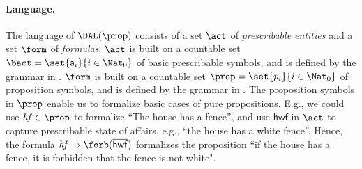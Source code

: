 
\paragraph{Language.}
	The language of $\DAL(\prop)$ consists of a set $\act$ of \emph{prescribable  entities} and a set $\form$ of \emph{formulas}.
	$\act$ is built on a countable set $\bact = \set{\mathsf{a}_i}{i\in \Nat_0}$ of basic prescribable symbols, and is defined by the grammar in .
	$\form$ is built on a countable set $\prop = \set{p_i}{i \in \Nat_0}$ of proposition symbols, and is defined by the grammar in .
The proposition symbols in $\prop$ enable us to formalize basic cases of pure propositions. E.g., we could use $\mathit{hf} \in \prop$ to formalize ``The house has a  fence'',  and
use $\mathsf{hwf}$ in $\act$ to capture prescribable state of affairs,  e.g.,  ``the house has a white fence''.  Hence,  the formula $\mathit{hf} \to \forb(\overline{\mathsf{hwf}})$ formalizes the proposition ``if the house has a fence, it is forbidden that the fence is not white".



